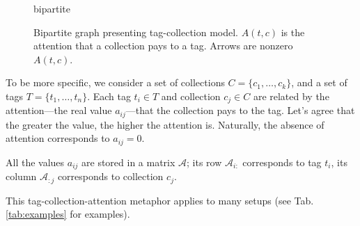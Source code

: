 \documentclass{llncs}
\begin{document}
\begin{figure}
    \centering
    {bipartite}
    \caption{Bipartite graph presenting tag-collection model. $A(t,c)$ is the attention that a collection pays to a tag. Arrows are nonzero $A(t,c)$.}
    \label{fig:nice_name}
\end{figure}

To be more specific, we consider a set of collections $C = \{c_1, \dots, c_k\}$, and a set of tags $T = \{t_1, \dots, t_n\}$.
Each tag $t_i \in T$ and collection $c_j \in C$ are related by the attention---the real value $a_{ij}$---that the collection pays to the tag.
Let's agree that the greater the value, the higher the attention is. Naturally, the absence of attention corresponds to $a_{ij} = 0$. 

All the values $a_{ij}$ are stored in a matrix $\mathcal{A}$; its row $\mathcal{A}_{i:}$ corresponds to tag $t_i$, its column $\mathcal{A}_{:j}$ corresponds to collection $c_j$.

This tag-collection-attention metaphor applies to many setups (see Tab.\ref{tab:examples} for examples).
\end{document}
